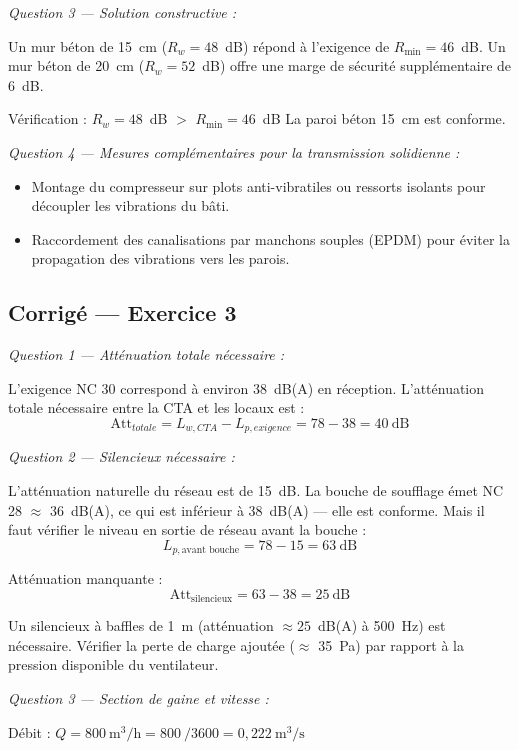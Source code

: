 \textit{Question 3 — Solution constructive :}

Un mur béton de 15~cm ($R_w = 48$~dB) répond à l'exigence de $R_{\min} = 46$~dB. Un mur béton de 20~cm ($R_w = 52$~dB) offre une marge de sécurité supplémentaire de 6~dB.

\begin{methode}
Vérification : $R_w = 48$~dB $>$ $R_{\min} = 46$~dB \checkmark \quad La paroi béton 15~cm est conforme.
\end{methode}

\textit{Question 4 — Mesures complémentaires pour la transmission solidienne :}
\begin{itemize}
  \item Montage du compresseur sur plots anti-vibratiles ou ressorts isolants pour découpler les vibrations du bâti.
  \item Raccordement des canalisations par manchons souples (EPDM) pour éviter la propagation des vibrations vers les parois.
\end{itemize}

\subsection*{Corrigé — Exercice 3}

\textit{Question 1 — Atténuation totale nécessaire :}

L'exigence NC 30 correspond à environ 38~dB(A) en réception. L'atténuation totale nécessaire entre la CTA et les locaux est :
\[
  \text{Att}_{totale} = L_{w,CTA} - L_{p,exigence} = 78 - 38 = 40~\text{dB}
\]

\textit{Question 2 — Silencieux nécessaire :}

L'atténuation naturelle du réseau est de 15~dB. La bouche de soufflage émet NC 28 $\approx$ 36~dB(A), ce qui est inférieur à 38~dB(A) — elle est conforme. Mais il faut vérifier le niveau en sortie de réseau avant la bouche :
\[
  L_{p,\text{avant bouche}} = 78 - 15 = 63~\text{dB}
\]

Atténuation manquante :
\[
  \text{Att}_{\text{silencieux}} = 63 - 38 = \boxed{25~\text{dB}}
\]

Un silencieux à baffles de 1~m (atténuation $\approx 25$~dB(A) à 500~Hz) est nécessaire. Vérifier la perte de charge ajoutée ($\approx$ 35~Pa) par rapport à la pression disponible du ventilateur.

\textit{Question 3 — Section de gaine et vitesse :}

Débit : $Q = \SI{800}{\m^3 \per \hour} = \SI{800}{} / 3600 = 0{,}222~\text{m}^3/\text{s}$

